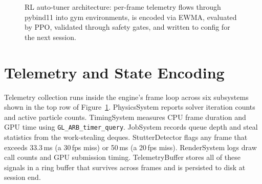 \documentclass[9pt,openany]{extbook}
\begin{document}
\begin{figure}[p]
\caption{RL auto-tuner architecture: per-frame telemetry flows through pybind11 into
         gym environments, is encoded via EWMA, evaluated by PPO, validated through
         safety gates, and written to config for the next session.}
\label{fig:rl_full_pipeline}
\end{figure}

\section{Telemetry and State Encoding}

Telemetry collection runs inside the engine's frame loop across six subsystems shown in the top row of Figure~\ref{fig:rl_full_pipeline}. PhysicsSystem reports solver iteration counts and active particle counts. TimingSystem measures CPU frame duration and GPU time using \texttt{GL\_ARB\_timer\_query}. JobSystem records queue depth and steal statistics from the work-stealing deques. StutterDetector flags any frame that exceeds 33.3\,ms (a 30\,fps miss) or 50\,ms (a 20\,fps miss). RenderSystem logs draw call counts and GPU submission timing. TelemetryBuffer stores all of these signals in a ring buffer that survives across frames and is persisted to disk at session end.
\end{document}
